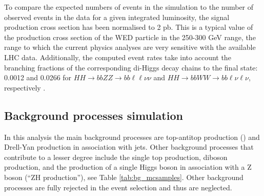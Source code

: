 To compare the expected numbers of events in the simulation to the number of observed events in the data for a given integrated luminosity, the signal production cross section has been normalised to 2 pb. This is a typical value of the production cross section of the WED particle in the 250-300 GeV range, the range to which the current physics analyses are very sensitive with the available LHC data. Additionally, the computed event rates take into account the branching fractions of the corresponding di-Higgs decay chains to the final state: 0.0012 and 0.0266 for $HH\to bbZZ\to bb\ell\ell\nu\nu$ and $HH\to bbWW\to bb\ell\nu\ell\nu$, respectively \cite{CERNYR4}.

%
%

\subsection{Background processes simulation\label{sec:bkgMC}}
In this analysis the main background processes are top-antitop production (\ttbar) and Drell-Yan production in association with jets. 
Other background processes that contribute to a lesser degree include the single top production, diboson production, and the production of a single Higgs boson in association with a Z boson (``ZH production''), see Table \ref{tab:bg_mcsamples}. Other background processes are fully rejected in the event selection and thus are neglected.  

